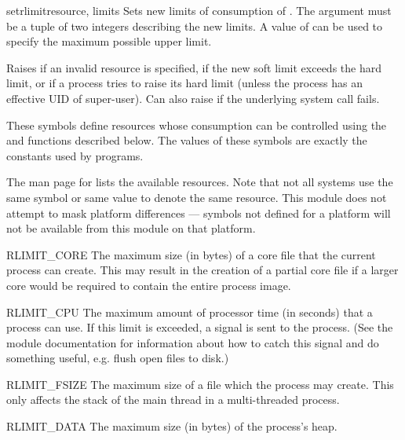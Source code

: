 \begin{funcdesc}{setrlimit}{resource, limits}
  Sets new limits of consumption of . The 
  argument must be a tuple  of two
  integers describing the new limits. A value of  can be used to
  specify the maximum possible upper limit.

  Raises  if an invalid resource is specified,
  if the new soft limit exceeds the hard limit, or if a process tries
  to raise its hard limit (unless the process has an effective UID of
  super-user).  Can also raise  if the underlying
  system call fails.
\end{funcdesc}

These symbols define resources whose consumption can be controlled
using the  and  functions
described below. The values of these symbols are exactly the constants
used by \C{} programs.

The \UNIX{} man page for  lists the available
resources.  Note that not all systems use the same symbol or same
value to denote the same resource.  This module does not attempt to
mask platform differences --- symbols not defined for a platform will
not be available from this module on that platform.

\begin{datadesc}{RLIMIT_CORE}
  The maximum size (in bytes) of a core file that the current process
  can create.  This may result in the creation of a partial core file
  if a larger core would be required to contain the entire process
  image.
\end{datadesc}

\begin{datadesc}{RLIMIT_CPU}
  The maximum amount of processor time (in seconds) that a process can
  use. If this limit is exceeded, a  signal is sent to
  the process. (See the  module documentation for
  information about how to catch this signal and do something useful,
  e.g. flush open files to disk.)
\end{datadesc}

\begin{datadesc}{RLIMIT_FSIZE}
  The maximum size of a file which the process may create.  This only
  affects the stack of the main thread in a multi-threaded process.
\end{datadesc}

\begin{datadesc}{RLIMIT_DATA}
  The maximum size (in bytes) of the process's heap.
\end{datadesc}

